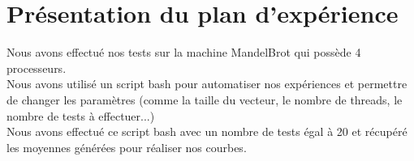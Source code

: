 \documentclass{article}
\begin{document}
\section{Présentation du plan d'expérience}

Nous avons effectué nos tests sur la machine MandelBrot qui possède 4 processeurs.\\

Nous avons utilisé un script bash pour automatiser nos expériences et permettre de changer les paramètres (comme la taille du vecteur, le nombre de threads, le nombre de tests à effectuer...)\\

Nous avons effectué ce script bash avec un nombre de tests égal à 20 et récupéré les moyennes générées pour réaliser nos courbes.\\
\end{document}
